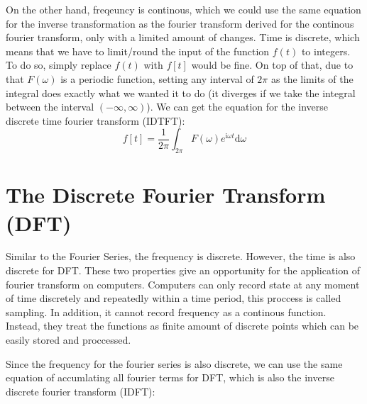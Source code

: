 \documentclass[12pt]{article}
\begin{document}
On the other hand, freqeuncy is continous, which we could use the same equation for 
the inverse transformation as the fourier transform derived for the continous fourier transform, 
only with a limited amount of changes. 
Time is discrete, which means that we have to limit/round the input of the function $f(t)$ to integers. 
To do so, simply replace $f(t)$ with $f[t]$ would be fine. 
On top of that, due to that $F(\omega)$ is a periodic function, 
setting any interval of $2\pi$ as the limits of the integral does exactly what we wanted it to do 
(it diverges if we take the integral between the interval $(-\infty,\infty)$). 
We can get the equation for 
the inverse discrete time fourier transform (IDTFT):
\begin{equation}
    f[t] = \frac{1}{2\pi} \int_{2\pi} F(\omega) e^{\mathrm{i}\omega t} \mathrm{d}\omega
    \label{equ:IDTFT}
\end{equation}
















\section{The Discrete Fourier Transform (DFT)}
Similar to the Fourier Series, the frequency is discrete. 
However, the time is also discrete for DFT. 
These two properties give an opportunity for the application of fourier transform on computers. 
Computers can only record state at any moment of time discretely and repeatedly within a time period, 
this proccess is called sampling. In addition, it cannot record frequency as a continous function. 
Instead, they treat the functions as finite amount of discrete points which can be easily stored and proccessed.

Since the frequency for the fourier series is also discrete, 
we can use the same equation of accumlating all fourier terms for DFT, 
which is also the inverse discrete fourier transform (IDFT):
\end{document}
